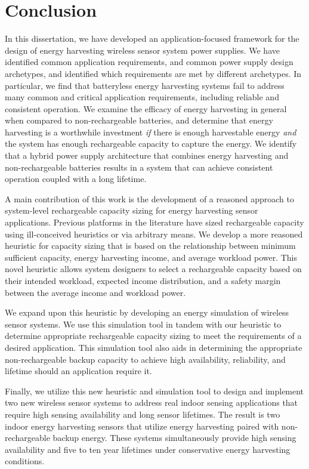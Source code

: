 \chapter{Conclusion}
\label{chap:conc}

In this dissertation, we have developed an application-focused framework for the design of energy harvesting wireless sensor system power supplies.
We have identified common application requirements, and common power supply design archetypes, and identified which requirements are met by different archetypes.
In particular, we find that batteryless energy harvesting systems fail to address many common and critical application requirements, including reliable and consistent operation.
We examine the efficacy of energy harvesting in general when compared to non-rechargeable batteries, and determine that energy harvesting is a worthwhile investment \textit{if} there is enough harvestable energy \textit{and} the system has enough rechargeable capacity to capture the energy.
We identify that a hybrid power supply architecture that combines energy harvesting and non-rechargeable batteries results in a system that can achieve consistent operation coupled with a long lifetime.

A main contribution of this work is the development of a reasoned approach to system-level rechargeable capacity sizing for energy harvesting sensor applications.
Previous platforms in the literature have sized rechargeable capacity using ill-conceived heuristics or via arbitrary means.
We develop a more reasoned heuristic for capacity sizing that is based on the relationship between minimum sufficient capacity, energy harvesting income, and average workload power.
This novel heuristic allows system designers to select a rechargeable capacity based on their intended workload, expected income distribution, and a safety margin between the average income and workload power.

We expand upon this heuristic by developing an energy simulation of wireless sensor systems.
We use this simulation tool in tandem with our heuristic to determine appropriate rechargeable capacity sizing to meet the requirements of a desired application.
This simulation tool also aids in determining the appropriate non-rechargeable backup capacity to achieve high availability, reliability, and lifetime should an application require it.

Finally, we utilize this new heuristic and simulation tool to design and implement two new wireless sensor systems to address real indoor sensing applications that require high sensing availability and long sensor lifetimes.
The result is two indoor energy harvesting sensors that utilize energy harvesting paired with non-rechargeable backup energy.
These systems simultaneously provide high sensing availability and five to ten year lifetimes under conservative energy harvesting conditions.

